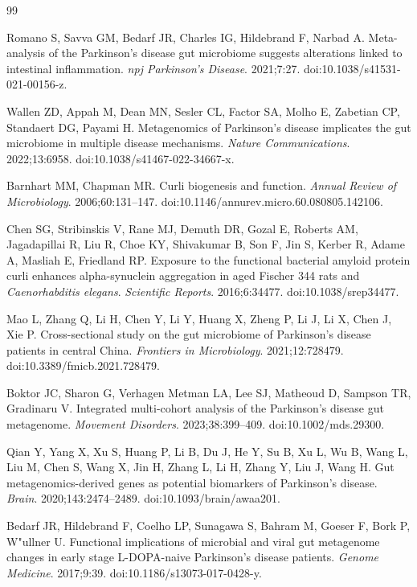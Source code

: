 \documentclass[12pt]{article}
\begin{document}




\begin{thebibliography}{99}

Romano S, Savva GM, Bedarf JR, Charles IG, Hildebrand F, Narbad A.
Meta-analysis of the Parkinson's disease gut microbiome suggests alterations linked to intestinal inflammation.
\textit{npj Parkinson's Disease}. 2021;7:27. doi:10.1038/s41531-021-00156-z.

Wallen ZD, Appah M, Dean MN, Sesler CL, Factor SA, Molho E, Zabetian CP, Standaert DG, Payami H.
Metagenomics of Parkinson's disease implicates the gut microbiome in multiple disease mechanisms.
\textit{Nature Communications}. 2022;13:6958. doi:10.1038/s41467-022-34667-x.

Barnhart MM, Chapman MR.
Curli biogenesis and function.
\textit{Annual Review of Microbiology}. 2006;60:131--147. doi:10.1146/annurev.micro.60.080805.142106.

Chen SG, Stribinskis V, Rane MJ, Demuth DR, Gozal E, Roberts AM, Jagadapillai R, Liu R, Choe KY, Shivakumar B, Son F, Jin S, Kerber R, Adame A, Masliah E, Friedland RP.
Exposure to the functional bacterial amyloid protein curli enhances alpha-synuclein aggregation in aged Fischer 344 rats and \textit{Caenorhabditis elegans}.
\textit{Scientific Reports}. 2016;6:34477. doi:10.1038/srep34477.

Mao L, Zhang Q, Li H, Chen Y, Li Y, Huang X, Zheng P, Li J, Li X, Chen J, Xie P.
Cross-sectional study on the gut microbiome of Parkinson's disease patients in central China.
\textit{Frontiers in Microbiology}. 2021;12:728479. doi:10.3389/fmicb.2021.728479.

Boktor JC, Sharon G, Verhagen Metman LA, Lee SJ, Matheoud D, Sampson TR, Gradinaru V.
Integrated multi-cohort analysis of the Parkinson's disease gut metagenome.
\textit{Movement Disorders}. 2023;38:399--409. doi:10.1002/mds.29300.

Qian Y, Yang X, Xu S, Huang P, Li B, Du J, He Y, Su B, Xu L, Wu B, Wang L, Liu M, Chen S, Wang X, Jin H, Zhang L, Li H, Zhang Y, Liu J, Wang H.
Gut metagenomics-derived genes as potential biomarkers of Parkinson's disease.
\textit{Brain}. 2020;143:2474--2489. doi:10.1093/brain/awaa201.

Bedarf JR, Hildebrand F, Coelho LP, Sunagawa S, Bahram M, Goeser F, Bork P, W"ullner U.
Functional implications of microbial and viral gut metagenome changes in early stage L-DOPA-naive Parkinson's disease patients.
\textit{Genome Medicine}. 2017;9:39. doi:10.1186/s13073-017-0428-y.

\end{thebibliography}
\end{document}

